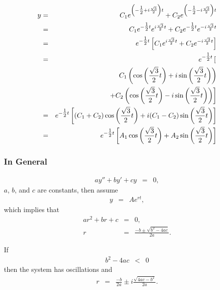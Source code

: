 \begin{frame}
  \begin{eqnarray*}
    y & = & C_1 e^{\left(-\mbox{$\frac{1}{2}$} + i \frac{\sqrt{3}}{2}\right) t} + C_2 e^{\left( -\mbox{$\frac{1}{2}$} - i \frac{\sqrt{3}}{2}\right) t} \\
    & = & C_1 e^{-\mbox{$\frac{1}{2}$} t}e^{i \frac{\sqrt{3}}{2}t} + C_2 e^{-\mbox{$\frac{1}{2}$} t}e^{ - i \frac{\sqrt{3}}{2}t} \\
    & = & e^{-\mbox{$\frac{1}{2}$} t} \left[ C_1 e^{i \frac{\sqrt{3}}{2}t} + C_2 e^{ - i \frac{\sqrt{3}}{2}t} \right] \\
    & = & e^{-\mbox{$\frac{1}{2}$} t} \left[ \right. \\
    &   & C_1 \left( \cos\left(\frac{\sqrt{3}}{2}t\right) + i \sin\left( \frac{\sqrt{3}}{2} t \right) \right) \\ 
    &   & \left. + C_2 \left( \cos\left(\frac{\sqrt{3}}{2}t\right) - i \sin\left(\frac{\sqrt{3}}{2}t\right)\right)  \right] \\
    & = & e^{-\mbox{$\frac{1}{2}$} t} \left[ 
          (C_1+C_2) \cos\left(\frac{\sqrt{3}}{2}t\right) + i(C_1-C_2) \sin\left( \frac{\sqrt{3}}{2}t\right) \right] \\ 
    & = & e^{-\mbox{$\frac{1}{2}$} t} \left[ 
          A_1 \cos\left(\frac{\sqrt{3}}{2} t \right) + A_2 \sin\left( \frac{\sqrt{3}}{2} t \right) \right] \\ 
  \end{eqnarray*}
\end{frame}

\begin{frame}
  \frametitle{In General}

  \begin{eqnarray*}
    a y'' + by' + cy & = & 0,
  \end{eqnarray*}
  $a$, $b$, and $c$ are constants, then assume
  \begin{eqnarray*}
    y & = & A e^{rt},
  \end{eqnarray*}
  which implies that
  \begin{eqnarray*}
    a r^2 + b r + c & = & 0, \\
    r & = & \frac{-b\pm\sqrt{b^2-4ac}}{2a}.
  \end{eqnarray*}

  If
  \begin{eqnarray*}
    b^2-4ac & < & 0
  \end{eqnarray*}
  then the system has oscillations and
  \begin{eqnarray*}
    r & = & \frac{-b}{2a} \pm i \frac{\sqrt{4ac-b^2}}{2a}.
  \end{eqnarray*}

\end{frame}

